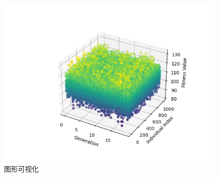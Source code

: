 \documentclass[withoutpreface,bwprint]{thesis-config}
\begin{document}
\begin{figure}[!htbp]
\begin{minipage}[b]{0.7\linewidth}
            \includegraphics[width=1\textwidth]{figures/3.2.1.png}
            \caption{图形可视化}
        \end{minipage}%
    \end{figure}
\end{document}
